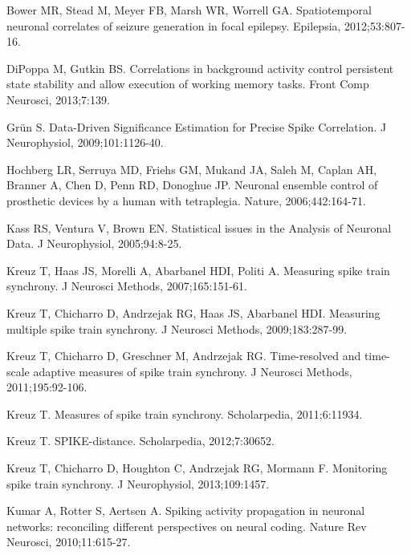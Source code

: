 \documentclass[10pt,twocolumn]{elsart5p}
\begin{document}
\begin{thebibliography}{25}

Bower MR, Stead M, Meyer FB, Marsh WR, Worrell GA. Spatiotemporal neuronal correlates of seizure generation in focal epilepsy. Epilepsia, 2012;53:807-16.

{DiPoppa} M, Gutkin BS. Correlations in background activity control persistent state stability and allow execution of working memory tasks. Front Comp Neurosci, 2013;7:139.

Gr{\"u}n S. Data-Driven Significance Estimation for Precise Spike Correlation. J Neurophysiol, 2009;101:1126-40.

Hochberg LR, Serruya MD, Friehs GM, Mukand JA, Saleh M, Caplan AH, Branner A, Chen D, Penn RD, Donoghue JP. Neuronal ensemble control of prosthetic devices by a human with tetraplegia. Nature, 2006;442:164-71.

Kass RS, Ventura V, Brown EN. Statistical issues in the Analysis of Neuronal Data. J Neurophysiol, 2005;94:8-25.

Kreuz T, Haas JS, Morelli A, Abarbanel HDI, Politi A. Measuring spike train synchrony. J Neurosci Methods, 2007;165:151-61.

Kreuz T, Chicharro D, Andrzejak RG, Haas JS, Abarbanel HDI. Measuring multiple spike train synchrony. J Neurosci Methods, 2009;183:287-99.

Kreuz T, Chicharro D, Greschner M, Andrzejak RG. Time-resolved and time-scale adaptive measures of spike train synchrony. J Neurosci Methods, 2011;195:92-106.

Kreuz T. Measures of spike train synchrony. Scholarpedia, 2011;6:11934.

Kreuz T. SPIKE-distance. Scholarpedia, 2012;7:30652.

Kreuz T, Chicharro D, Houghton C, Andrzejak RG, Mormann F. Monitoring spike train synchrony. J Neurophysiol, 2013;109:1457.

Kumar A, Rotter S, Aertsen A. Spiking activity propagation in neuronal networks: reconciling different perspectives on neural coding. Nature Rev Neurosci, 2010;11:615-27.


\end{thebibliography}
\end{document}
